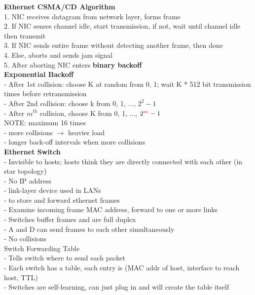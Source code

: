 \documentclass[10pt, a4paper]{article}
\newcommand{\highlight}[1]{{\color{red}\textbf{#1}}}
\newcommand{\red}[1]{{\color{red}#1}}
\newcommand{\tab}[0]{\hspace*{2mm}}
\begin{document}
\begin{multicols*}{3}
		\textbf{Ethernet CSMA/CD Algorithm}\\
		1. NIC receives datagram from network layer, forms frame\\
		2. If NIC senses channel idle, start transmission, if not, wait until channel idle then transmit\\
		3. If NIC sends entire frame without detecting another frame, then done\\
		4. Else, \red{aborts and sends jam signal}\\
		5. After aborting NIC enters \highlight{binary backoff}\\

		\textbf{Exponential Backoff}\\
		- After 1st collision: choose \red{K} at random from {0, 1}; wait \red{K} * 512 bit transmission times before retransmission\\
		- After 2nd collision: choose \red{k} from {0, 1, ..., $2^{2}-1$}\\
		- After \red{$m^{th}$} collision, choose \red{K} from {0, 1, ..., $2^{\red{m}} - 1$}\\
		NOTE: maximum 16 times\\
		- more collisions $\rightarrow$ heavier load\\
		- longer back-off intervals when more collisions\\

		\textbf{Ethernet Switch}\\
		- \red{Invisible to hosts}; hosts think they are directly connected with each other (in star topology)\\
		\tab - No IP address\\
		- link-layer device used in LANs\\
		\tab - to store and forward ethernet frames\\
		\tab - Examine incoming frame MAC address, forward to one or more links\\
		- Switches buffer frames and are full duplex\\
		\tab - A and D can send frames to each other \red{simultaneously}\\
		- No collisions\\

		Switch Forwarding Table\\
		- Tells switch where to send each packet\\
		- Each switch has a table, each entry is (MAC addr of host, interface to reach host, TTL)\\
		- Switches are self-learning, can just plug in and will create the table itself\\


\end{multicols*}
\end{document}
